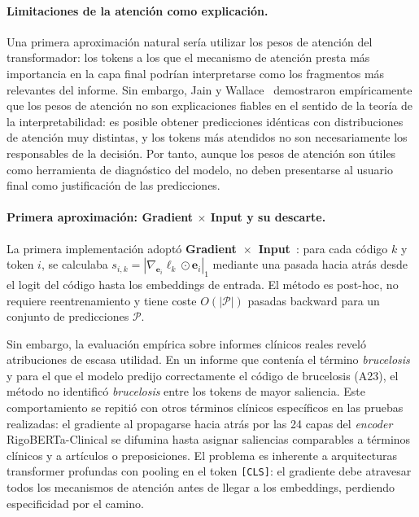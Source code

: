 \paragraph{Limitaciones de la atención como explicación.}
Una primera aproximación natural sería utilizar los pesos de atención del transformador: los tokens a los que el mecanismo de atención presta más importancia en la capa final podrían interpretarse como los fragmentos más relevantes del informe. Sin embargo, Jain y Wallace~\cite{Jain19} demostraron empíricamente que los pesos de atención no son explicaciones fiables en el sentido de la teoría de la interpretabilidad: es posible obtener predicciones idénticas con distribuciones de atención muy distintas, y los tokens más atendidos no son necesariamente los responsables de la decisión. Por tanto, aunque los pesos de atención son útiles como herramienta de diagnóstico del modelo, no deben presentarse al usuario final como justificación de las predicciones.

\paragraph{Primera aproximación: Gradient $\times$ Input y su descarte.}
La primera implementación adoptó \textbf{Gradient~$\times$~Input}~\cite{Simonyan14}: para cada código $k$ y token $i$, se calculaba $s_{i,k} = |\nabla_{\mathbf{e}_i}\ell_k \odot \mathbf{e}_i|_1$ mediante una pasada hacia atrás desde el logit del código hasta los embeddings de entrada. El método es post-hoc, no requiere reentrenamiento y tiene coste $O(|\mathcal{P}|)$ pasadas backward para un conjunto de predicciones $\mathcal{P}$.

Sin embargo, la evaluación empírica sobre informes clínicos reales reveló atribuciones de escasa utilidad. En un informe que contenía el término \emph{brucelosis} y para el que el modelo predijo correctamente el código de brucelosis (A23), el método no identificó \emph{brucelosis} entre los tokens de mayor saliencia. Este comportamiento se repitió con otros términos clínicos específicos en las pruebas realizadas: el gradiente al propagarse hacia atrás por las 24 capas del \emph{encoder} RigoBERTa-Clinical se difumina hasta asignar saliencias comparables a términos clínicos y a artículos o preposiciones. El problema es inherente a arquitecturas transformer profundas con pooling en el token \texttt{[CLS]}: el gradiente debe atravesar todos los mecanismos de atención antes de llegar a los embeddings, perdiendo especificidad por el camino.

